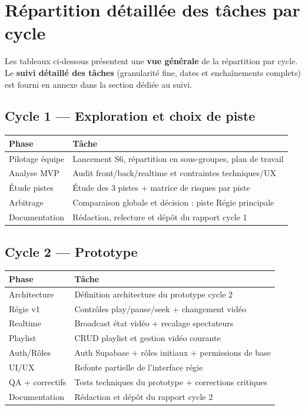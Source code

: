 \documentclass[11pt,a4paper]{report}
\begin{document}
\section{Répartition détaillée des tâches par cycle}
Les tableaux ci-dessous présentent une \textbf{vue générale} de la répartition par cycle.  
Le \textbf{suivi détaillé des tâches} (granularité fine, dates et enchaînements complets) est fourni en annexe dans la section dédiée au suivi.

\subsection{Cycle 1 --- Exploration et choix de piste}
\begin{longtable}{L{0.28\textwidth} L{0.60\textwidth}}
\toprule
{}
\textbf{Phase} & \textbf{Tâche} \\
\midrule
Pilotage équipe & Lancement S6, répartition en sous-groupes, plan de travail \\
Analyse MVP & Audit front/back/realtime et contraintes techniques/UX \\
Étude pistes & Étude des 3 pistes + matrice de risques par piste \\
Arbitrage & Comparaison globale et décision : piste Régie principale \\
Documentation & Rédaction, relecture et dépôt du rapport cycle 1 \\
\bottomrule
\end{longtable}

\subsection{Cycle 2 --- Prototype}
\begin{longtable}{L{0.28\textwidth} L{0.60\textwidth}}
\toprule
{}
\textbf{Phase} & \textbf{Tâche} \\
\midrule
Architecture & Définition architecture du prototype cycle 2 \\
Régie v1 & Contrôles play/pause/seek + changement vidéo \\
Realtime & Broadcast état vidéo + recalage spectateurs \\
Playlist & CRUD playlist et gestion vidéo courante \\
Auth/Rôles & Auth Supabase + rôles initiaux + permissions de base \\
UI/UX & Refonte partielle de l'interface régie \\
QA + correctifs & Tests techniques du prototype + corrections critiques \\
Documentation & Rédaction et dépôt du rapport cycle 2 \\
\bottomrule
\end{longtable}
\end{document}
